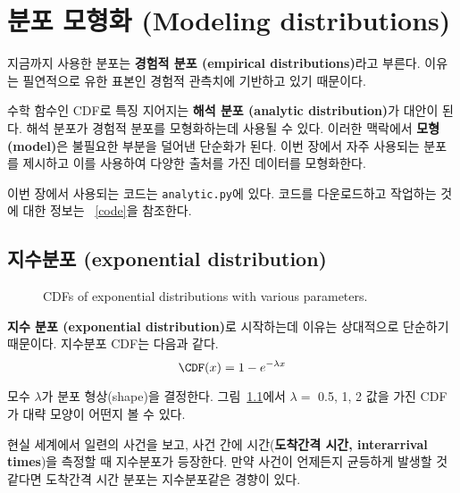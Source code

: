 \chapter{분포 모형화 (Modeling distributions)}
\label{modeling}

지금까지 사용한 분포는 {\bf 경험적 분포 (empirical distributions)}라고 부른다.
이유는 필연적으로 유한 표본인 경험적 관측치에 기반하고 있기 때문이다.


수학 함수인 CDF로 특징 지어지는 {\bf 해석 분포 (analytic distribution)}가 대안이 된다.
해석 분포가 경험적 분포를 모형화하는데 사용될 수 있다.
이러한 맥락에서 {\bf 모형(model)}은 불필요한 부분을 덜어낸 단순화가 된다.
이번 장에서 자주 사용되는 분포를 제시하고 이를 사용하여 다양한 출처를 가진 
데이터를 모형화한다.


이번 장에서 사용되는 코드는 {\tt analytic.py}에 있다.
코드를 다운로드하고 작업하는 것에 대한 정보는 ~\ref{code}을 참조한다.


\section{지수분포 (exponential distribution)}
\label{exponential}

\begin{figure}
\caption{CDFs of exponential distributions with various parameters.}
\label{analytic_expo_cdf}
\end{figure}

{\bf 지수 분포 (exponential distribution)}로 시작하는데 이유는 상대적으로 단순하기 때문이다.
지수분포 CDF는 다음과 같다.
%
\[ \CDF(x) = 1 - e^{-\lambda x} \]
%

모수 $\lambda$가 분포 형상(shape)을 결정한다. 
그림~\ref{analytic_expo_cdf}에서 $\lambda = $ 0.5, 1, 2 값을 가진
CDF가 대략 모양이 어떤지 볼 수 있다.

현실 세계에서 일련의 사건을 보고, 사건 간에 시간({\bf 도착간격 시간, interarrival times})을 측정할 때 지수분포가 등장한다.
만약 사건이 언제든지 균등하게 발생할 것 같다면 도착간격 시간 분포는 지수분포같은 경향이 있다.

